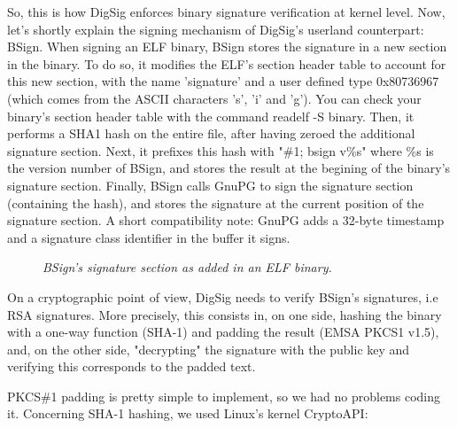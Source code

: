 \documentclass{article}
\begin{document}
So, this is how DigSig enforces binary signature verification at
kernel level. Now, let's shortly explain the signing mechanism of
DigSig's userland counterpart: BSign. When signing an ELF binary,
BSign stores the signature in a new section in the binary.  To do so,
it modifies the ELF's section header table to account for this new
section, with the name 'signature' and a user defined type 0x80736967
(which comes from the ASCII characters 's', 'i' and 'g'). You can
check your binary's section header table with the command readelf -S
binary.  Then, it performs a SHA1 hash on the entire file, after
having zeroed the additional signature section.  Next, it prefixes
this hash with "\#1; bsign v\%s" where \%s is the version number of
BSign, and stores the result at the begining of the binary's signature
section. Finally, BSign calls GnuPG to sign the signature section
(containing the hash), and stores the signature at the current position
of the signature section. A short compatibility note: GnuPG adds a
32-byte timestamp and a signature class identifier in the
buffer it signs.

\begin{figure}[h]
\begin{center}
\epsfxsize=12cm 
\caption{{\it BSign's signature section as added in an ELF binary. }}
\label{fig2}
\end{center}
\end{figure}


On a cryptographic point of view, DigSig needs to verify 
BSign's signatures, i.e RSA signatures. More precisely, this 
consists in, on one side, hashing the binary
with a one-way function (SHA-1) and padding the result (EMSA PKCS1 v1.5), and,
on the other side, "decrypting" the signature with the public key
and verifying this corresponds to the padded text.

PKCS\#1 padding is pretty simple to implement, so we had no problems
coding it. Concerning SHA-1 hashing, we used Linux's kernel CryptoAPI:
\end{document}
